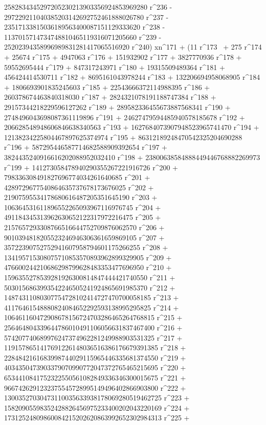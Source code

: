        2582834345297205230213903356924853969280 r^236 - 
       297229211040385203142692752461888026780 r^237 - 
       23517133815036189563400087151129333620 r^238 - 
       1137015714734748810465119316071205660 r^239 - 
       25202394358996989831281417065516920 r^240) xn^171 + (11 r^173 \
+ 275 r^174 + 25674 r^175 + 4947063 r^176 + 151932902 r^177 + 
       3827770936 r^178 + 59552695444 r^179 + 847317243971 r^180 + 
       19315509489364 r^181 + 456424414530711 r^182 + 
       8695161043978244 r^183 + 132206694958068905 r^184 + 
       1806693901835245603 r^185 + 22543666372114988395 r^186 + 
       260378674463840318030 r^187 + 2824321078191188747384 r^188 + 
       29157344218229596127262 r^189 + 
       289582336455673887568341 r^190 + 
       2748496043698087361119896 r^191 + 
       24627479594485940578185678 r^192 + 
       206628548948606846638340563 r^193 + 
       1627684073907948523965741470 r^194 + 
       12138234225804467897625374974 r^195 + 
       86312189248470542325204690288 r^196 + 
       587295446587714682588909392654 r^197 + 
       3824435240916616202088952032410 r^198 + 
       23800638584888449446768882269973 r^199 + 
       141273058478940290355267221916726 r^200 + 
       798336308491827696774034261640685 r^201 + 
       4289729677540864635737678173676025 r^202 + 
       21907595534178680616487205351645190 r^203 + 
       106364531611896552265093967116976745 r^204 + 
       491184345313962630652122317972216475 r^205 + 
       2157657293308766516644752709876062570 r^206 + 
       9010394818205523246946306361659869105 r^207 + 
       35722390752752941607958794601175266255 r^208 + 
       134195715308075710853570893962899329905 r^209 + 
       476600244210686298799628483353477696950 r^210 + 
       1596355278539281926300814847444421740550 r^211 + 
       5030156863993542246505241924865691985370 r^212 + 
       14874311080307754728102414727470700058185 r^213 + 
       41176461548880824084652292593138995295825 r^214 + 
       106461160472908678156724703286465264768815 r^215 + 
       256464804339644786010491106056631837467400 r^216 + 
       574207740689976247374962281249988903531325 r^217 + 
       1191578651417691226148036516386176679391385 r^218 + 
       2284842161683998744029115965446335681374550 r^219 + 
       4034350473903379070990772047372765465215695 r^220 + 
       6534410841752322550561082849336346300015675 r^221 + 
       9667426291232375545728995149496402866903800 r^222 + 
       13003527030473110035633938178069280519462725 r^223 + 
       15820905598352428826456975233400202043220169 r^224 + 
       17312524809860084215202620863992652302984313 r^225 + 
